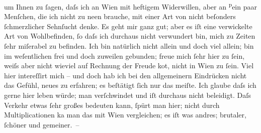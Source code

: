                um Ihnen zu{ }ſagen, daſs ich an Wien mit heftigem
               Widerwillen, aber an \substVorne{}\textsuperscript{p}\substDazwischen{}e\substHinten{}in paar Menſchen, die ich nicht zu ne{\geminationn}en
               brauche, mit einer Art \introOben{}von\introOben{} nicht beſonders {\pb}ſchmerzlicher Sehnſucht denke. Es geht mir ganz gut;
               aber es iſt eine verwickelte Art von Wohlbefinden,{ }ſo daſs ich durchaus nicht
               verwundert bin, mich zu Zeiten{ }ſehr miſerabel zu befinden. Ich bin natürlich nicht
               allein und doch viel allein; bin im weſentlichen frei und doch zuweilen gebunden;
               freue mich{ }ſehr hier zu{ }ſein, weiſs aber nicht wieviel auf Rechnung der {\pb}Freude ko{\geminationm}t, nicht in Wien zu{ }ſein. Viel hier intereſſirt mich – und doch
               hab ich bei den allgemeinern Eindrücken nicht das Gefühl, neues zu erfahren; es
               beſtätigt{ }ſich nur das meiſte. Ich glaube daſs ich gerne hier leben würde; man
               verſchwindet und iſt durchaus nicht beleidigt. Daſs Verkehr etwas{ }ſehr großes
               bedeuten kann,{ }ſpürt man hier; nicht {\pb}durch
               Multiplicationen ka{\geminationn} man das mit Wien vergleichen; es iſt was andres; brutaler,{ }ſchöner und
               gemeiner. –\pend
           
